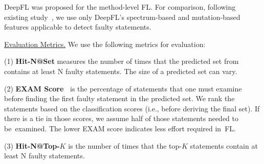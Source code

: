 
DeepFL was proposed for the method-level FL. For comparison, following
existing study~\cite{icse21-fl}, we use only DeepFL's spectrum-based
and mutation-based features applicable to detect faulty statements.


\underline{Evaluation Metrics.}  
We use the following metrics for evaluation:

(1) {\bf Hit-N@Set} measures the number of times that the predicted
set from {\tool} contains at least N faulty statements. The size of a
predicted set can vary.


(2) {\bf EXAM Score~\cite{wong2008crosstab}} is the percentage of
statements that one must examine before finding the first
faulty statement in the predicted set. We rank the statements based on
the classification scores (i.e., before deriving the final set).
If there is a tie in those scores, we assume half of
those statements needed to be~examined. The lower EXAM score indicates
less effort required in~FL.

(3) {\bf Hit-N@Top-$K$} is the number of times that the top-$K$
statements contain at least N faulty statements.



